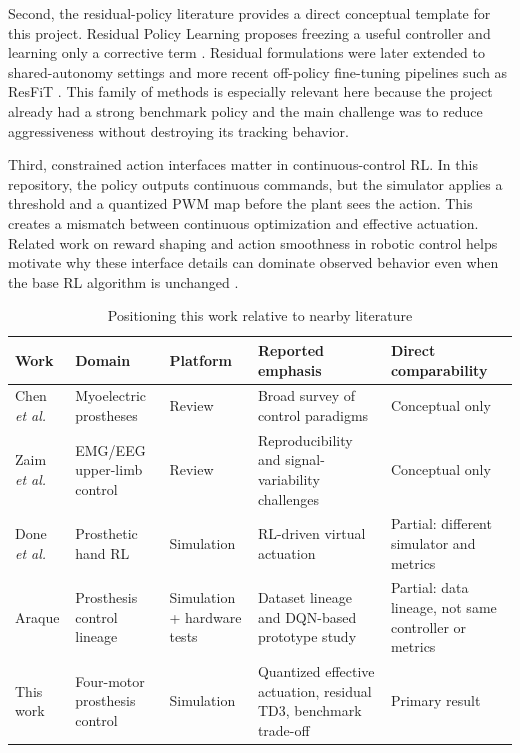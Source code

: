 \documentclass[conference]{IEEEtran}
\begin{document}
Second, the residual-policy literature provides a direct conceptual template for this project. Residual Policy Learning proposes freezing a useful controller and learning only a corrective term \cite{silver2018residual}. Residual formulations were later extended to shared-autonomy settings \cite{schaff2020shared} and more recent off-policy fine-tuning pipelines such as ResFiT \cite{resfit2025}. This family of methods is especially relevant here because the project already had a strong benchmark policy and the main challenge was to reduce aggressiveness without destroying its tracking behavior.

Third, constrained action interfaces matter in continuous-control RL. In this repository, the policy outputs continuous commands, but the simulator applies a threshold and a quantized PWM map before the plant sees the action. This creates a mismatch between continuous optimization and effective actuation. Related work on reward shaping and action smoothness in robotic control helps motivate why these interface details can dominate observed behavior even when the base RL algorithm is unchanged \cite{deng2025reward,lee2024smoothness}.

\begin{table}[t]
\centering
\caption{Positioning this work relative to nearby literature}
\label{tab:related-positioning}
\footnotesize
\begin{tabularx}{\columnwidth}{L{1.55cm}L{1.25cm}L{1.4cm}Y Y}
\toprule
Work & Domain & Platform & Reported emphasis & Direct comparability \\
\midrule
Chen \emph{et al.} \cite{chen2023review} & Myoelectric prostheses & Review & Broad survey of control paradigms & Conceptual only \\
Zaim \emph{et al.} \cite{zaim2025systematic} & EMG/EEG upper-limb control & Review & Reproducibility and signal-variability challenges & Conceptual only \\
Done \emph{et al.} \cite{done2025prostheticrl} & Prosthetic hand RL & Simulation & RL-driven virtual actuation & Partial: different simulator and metrics \\
Araque \cite{araque2024thesis} & Prosthesis control lineage & Simulation + hardware tests & Dataset lineage and DQN-based prototype study & Partial: data lineage, not same controller or metrics \\
This work & Four-motor prosthesis control & Simulation & Quantized effective actuation, residual TD3, benchmark trade-off & Primary result \\
\bottomrule
\end{tabularx}
\end{table}
\end{document}
